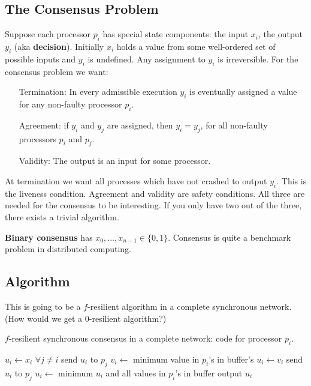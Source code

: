 \documentclass[twoside]{article}
\begin{document}
\subsection{The Consensus Problem}
Suppose each processor $p_i$ has special state components:  the input $x_i$, the output $y_i$ (aka \textbf{decision}). Initially $x_i$ holds a value from some well-ordered set of possible inputs and $y_i$ is undefined. Any assignment to $y_i$ is irreversible. For the consensus problem we want:
\begin{enumerate}
\item[Termination:] In every admissible execution $y_i$ is eventually assigned a value for any non-faulty processor $p_i$.
\item[Agreement:] if $y_i$ and $y_j$ are assigned, then $y_i = y_j$, for all non-faulty processors $p_i$ and $p_j$.
\item[Validity:] The output is an input for some processor. 
\end{enumerate}
At termination we want all processes which have not crashed to output $y_i$. This is the liveness condition. Agreement and validity are safety conditions. All three are needed for the consensus to be interesting. If you only have two out of the three, there exists a trivial algorithm. 

\textbf{Binary consensus} has $x_0, ..., x_{n-1} \in \{0,1\}$. Consensus is quite a benchmark problem in distributed computing. 

\subsection{Algorithm}
This is going to be a $f$-resilient algorithm in a complete synchronous network. (How would we get a $0$-resilient algorithm?)
\begin{algorithm}
	\caption{$f$-resilient synchronous consensus in a complete network: code for processor $p_i$.}
    \label{pseudocode:syncConsensus}
    \begin{algorithmic}[1]
    \State $u_i \leftarrow x_i$
    \State $\forall j \neq i$ send $u_i$ to $p_j$
    	\State $v_i \leftarrow$ minimum value in $p_i$'s in buffer's 
    		\State $u_i \leftarrow v_i$
    			\State send $u_i$ to $p_j$
    		\EndFor
    	\EndIf
    \EndFor
    \State $u_i \leftarrow$ minimum $u_i$ and all values in $p_i$'s in buffer
    \State output $u_i$
    \end{algorithmic}
\end{algorithm}
\end{document}
